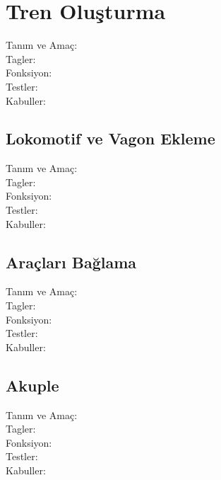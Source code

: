 \documentclass[10pt,a4paper]{article}
\begin{document}
\newpage

\section{Tren Oluşturma}
\begin{description}
\item[Tanım ve Amaç:] 
\item[Tagler:]
\item[Fonksiyon:]
\item[Testler:]
\item[Kabuller:]
\end{description}
\newpage

\subsection{Lokomotif ve Vagon Ekleme}
\begin{description}
\item[Tanım ve Amaç:] 
\item[Tagler:]
\item[Fonksiyon:]
\item[Testler:]
\item[Kabuller:]
\end{description}
\newpage

\subsection{Araçları Bağlama}
\begin{description}
\item[Tanım ve Amaç:] 
\item[Tagler:]
\item[Fonksiyon:]
\item[Testler:]
\item[Kabuller:]
\end{description}
\newpage

\subsection{Akuple}
\begin{description}
\item[Tanım ve Amaç:] 
\item[Tagler:]
\item[Fonksiyon:]
\item[Testler:]
\item[Kabuller:]
\end{description}
\newpage
\end{document}
